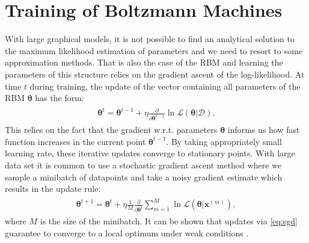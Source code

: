 \section{Training of Boltzmann Machines}
With large graphical models, it is not possible to find an analytical solution to the maximum likelihood estimation of parameters and we need to resort to some approximation methods. That is also the case of the RBM and learning the parameters of this structure relies on the gradient ascent of the log-likelihood. At time $t$ during training, the update of the vector containing all parameters of the RBM $\mathbf{\theta}$ has the form:
\begin{align}
\begin{split}
\mathbf{\theta}^{t} = \mathbf{\theta}^{t-1} + \eta  \frac{\partial}{\partial \mathbf{\theta}^{t-1}}  \ln \mathcal{L}(\mathbf{\theta}| \mathcal{D}). 
\end{split}
\end{align}
This relies on the fact that the gradient w.r.t. parameters $\mathbf{\theta}$ informs us how fast function increases in the current point $\mathbf{\theta}^{t-1}$. 
By taking appropriately small learning rate, these iterative updates converge to stationary points. With large data set it is common to use a stochastic gradient ascent method \cite{robbins1951stochastic} where we sample a minibatch of datapoints and take a noisy gradient estimate which results in the update rule:
\begin{align}
\begin{split}
\mathbf{\theta}^{t+1} = \mathbf{\theta}^{t} + \eta \frac{1}{M} \frac{\partial}{\partial \mathbf{\theta}^t}  \sum_{m =1}^{M} \ln \mathcal{L}(\mathbf{\theta}| \mathbf{x}^{(m)}),
\end{split}
\label{eq:sgd}
\end{align}
where $M$ is the size of the minibatch. It can be shown that updates via \ref{eq:sgd} guarantee to converge to a local optimum under weak conditions \cite{bottou1998online}.

